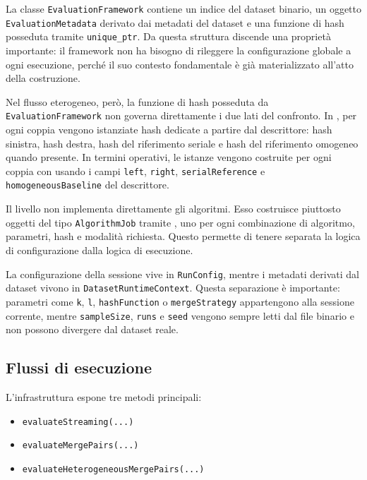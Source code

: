 La classe \texttt{EvaluationFramework} contiene un indice del dataset binario,
un oggetto \texttt{EvaluationMetadata} derivato dai metadati del dataset e una
funzione di hash posseduta tramite \texttt{unique\_ptr}. Da questa struttura
discende una proprietà importante: il framework non ha bisogno di rileggere la
configurazione globale a ogni esecuzione, perché il suo contesto fondamentale è
già materializzato all'atto della costruzione.

Nel flusso eterogeneo, però, la funzione di hash posseduta da
\texttt{EvaluationFramework} non governa direttamente i due lati del confronto.
In , per ogni coppia vengono
istanziate hash dedicate a partire dal descrittore:
hash sinistra, hash destra, hash del riferimento seriale e hash del riferimento
omogeneo quando presente. In termini operativi, le istanze vengono costruite per
ogni coppia con  usando i campi
\texttt{left}, \texttt{right}, \texttt{serialReference} e
\texttt{homogeneousBaseline} del descrittore.

Il livello  non implementa direttamente gli algoritmi. Esso
costruisce piuttosto oggetti del tipo \texttt{AlgorithmJob} tramite
, uno per ogni combinazione di algoritmo, parametri,
hash e modalità richiesta. Questo permette di tenere separata la logica di
configurazione dalla logica di esecuzione.

La configurazione della sessione vive in \texttt{RunConfig}, mentre i metadati
derivati dal dataset vivono in \texttt{DatasetRuntimeContext}. Questa
separazione è importante: parametri come \texttt{k}, \texttt{l},
\texttt{hashFunction} o \texttt{mergeStrategy} appartengono alla sessione
corrente, mentre \texttt{sampleSize}, \texttt{runs} e \texttt{seed} vengono
sempre letti dal file binario e non possono divergere dal dataset reale.

\subsection{Flussi di esecuzione}

L'infrastruttura espone tre metodi principali:
\begin{itemize}
    \item \texttt{evaluateStreaming(...)}
    \item \texttt{evaluateMergePairs(...)}
    \item \texttt{evaluateHeterogeneousMergePairs(...)}
\end{itemize}

